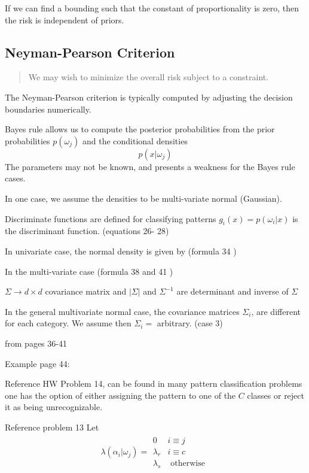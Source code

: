 \documentclass[11pt]{article}
\begin{document}
If we can find a bounding such that the constant of proportionality is zero, then the risk is independent of priors.  

\subsection{Neyman-Pearson Criterion}
\begin{quote}
	We may wish to minimize the overall risk subject to a constraint.  
\cite[33-34]{duda-hart-stork}
\end{quote}
The Neyman-Pearson criterion is typically computed by adjusting the decision boundaries numerically.  


Bayes rule allows us to compute the posterior probabilities from the prior probabilities $p(\omega_j)$ and the conditional densities 
\[ 
p(x | \omega_j)
\]
The parameters may not be known, and presents a weakness for the Bayes rule cases.  


In one case, we assume the densities to be multi-variate normal (Gaussian).  


Discriminate functions are defined for classifying patterns $g_i(x) = p(\omega_i | x)$ is the discriminant function.  \cite[29-30]{duda-hart-stork} (equations 26- 28)

In univariate case, the normal density is given by (formula 34 \cite[32]{duda-hart-stork}) 


In the multi-variate case (formula 38 and 41 \cite[33-34]{duda-hart-stork})

$\Sigma \to d \times d$  covariance matrix and $|\Sigma|$ and $\Sigma^{-1}$ are determinant and inverse of $\Sigma$


In the general multivariate normal case, the covariance matrices $\Sigma_{i}$, are different for each category.   We assume then $\Sigma_i = $ arbitrary.   (case 3)

from pages 36-41


Example page 44:  

Reference HW Problem 14, can be found in many pattern classification problems one has the option of either assigning the pattern to one of the $C$ classes or reject it as being unrecognizable.  


Reference problem 13
Let 
\begin{eqnarray*}
\lambda (\alpha_i | \omega_j) = 
\begin{array}{ll}
0 & i \equiv j \\
\lambda_ r &  i \equiv  c \\
\lambda_s & \textrm{ otherwise} 
\end{array} \
\end{eqnarray*}
\end{document}
